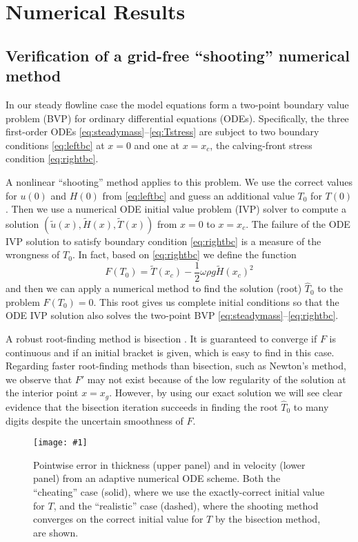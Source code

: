 \documentclass[twocolumn]{igs}
\newcommand{\onecol}[1]{\texttt{[image: \#1]}}
\begin{document}
\section{Numerical Results}

\subsection*{Verification of a grid-free ``shooting'' numerical method}  In our steady flowline case the model equations form a two-point boundary value problem (BVP) for ordinary differential equations (ODEs).  Specifically, the three first-order ODEs \eqref{eq:steadymass}--\eqref{eq:Tstress} are subject to two boundary conditions \eqref{eq:leftbc} at $x=0$ and one at $x=x_c$, the calving-front stress condition \eqref{eq:rightbc}.  

A nonlinear ``shooting'' method \citep[section 17.1]{Pressetal} applies to this problem.  We use the correct values for $u(0)$ and $H(0)$ from \eqref{eq:leftbc} and guess an additional value $T_0$ for $T(0)$.  Then we use a numerical ODE initial value problem (IVP) solver to compute a solution $(\tilde u(x),\tilde H(x),\tilde T(x))$ from $x=0$ to $x=x_c$.  The failure of the ODE IVP solution to satisfy boundary condition \eqref{eq:rightbc} is a measure of the wrongness of $T_0$.  In fact, based on \eqref{eq:rightbc} we define the function
\begin{equation}
F(T_0) = \tilde T(x_c) - \frac{1}{2} \omega \rho g \tilde H(x_c)^2  \label{eq:Fbisection}
\end{equation}
and then we can apply a numerical method to find the solution (root) $\hat T_0$ to the problem $F(T_0)=0$.  This root gives us complete initial conditions so that the ODE IVP solution also solves the two-point BVP \eqref{eq:steadymass}--\eqref{eq:rightbc}.

A robust root-finding method is bisection \citep[section 9.1]{Pressetal}.  It is guaranteed to converge if $F$ is continuous and if an initial bracket is given, which is easy to find in this case.  Regarding faster root-finding methods than bisection, such as Newton's method, we observe that $F'$ may not exist because of the low regularity of the solution at the interior point $x=x_g$. However, by using our exact solution we will see clear evidence that the bisection iteration succeeds in finding the root $\hat T_0$ to many digits despite the uncertain smoothness of $F$.

\begin{figure}[ht]
\onecol{em-error}
\caption{Pointwise error in thickness (upper panel) and in velocity (lower panel) from an adaptive numerical ODE scheme.  Both the ``cheating'' case (solid), where we use the exactly-correct initial value for $T$, and the ``realistic'' case (dashed), where the shooting method converges on the correct initial value for $T$ by the bisection method, are shown.} \label{fig:shoot-error}
\end{figure}
\end{document}
